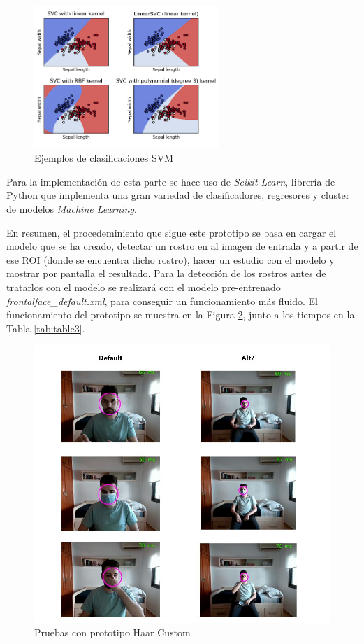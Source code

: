 \begin{enumerate}
	\begin{figure}[htp]
		\centering
		\includegraphics[width=7cm]{imagenes/svm_example.png}
		\caption{Ejemplos de clasificaciones SVM}
		\label{fig:svm}
	\end{figure}

	Para la implementación de esta parte se hace uso de \textit{Scikit-Learn}, librería de Python que implementa una gran variedad de clasificadores, regresores y cluster de modelos \textit{Machine Learning}.
\end{enumerate}

En resumen, el procedeminiento que sigue este prototipo se basa en cargar el modelo que se ha creado, detectar un rostro en al imagen de entrada y a partir de ese ROI (donde se encuentra dicho rostro), hacer un estudio con el modelo y mostrar por pantalla el resultado. Para la detección de los rostros antes de tratarlos con el modelo se realizará con el modelo pre-entrenado \textit{frontalface\_default.xml}, para conseguir un funcionamiento más fluido. El funcionamiento del prototipo se muestra en la Figura \ref{fig:haarCustom}, junto a los tiempos en la Tabla \ref{tab:table3}.

\begin{figure}[htp]
	\centering
	\includegraphics[width=12cm]{imagenes/prueba_proto1.jpg}
	\caption{Pruebas con prototipo Haar Custom}
	\label{fig:haarCustom}
\end{figure}

